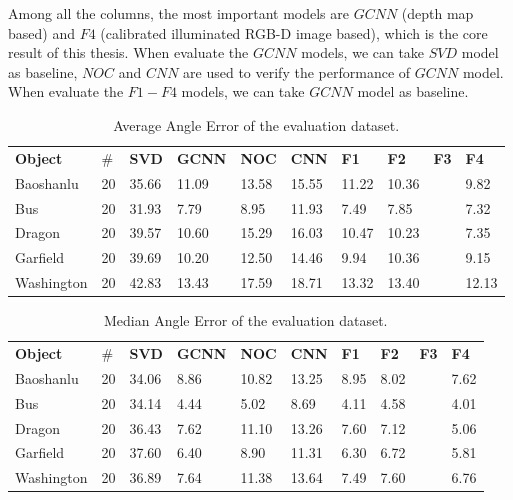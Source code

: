 \documentclass[border=15pt, multi, tikz]{article}
\newcommand{\tabhead}[1]{\textbf{#1}}
\begin{document}
Among all the columns, the most important models are $ GCNN $ (depth map based) and  $ F4 $ (calibrated illuminated RGB-D image based), which is the core result of this thesis. When evaluate the $ GCNN $ models, we can take $ SVD $ model as baseline, $ NOC $ and $ CNN $ are used to verify the performance of $ GCNN $ model. When evaluate the $ F1-F4 $ models, we can take $ GCNN $ model as baseline.


\begin{table}[H]
	\centering
	\begin{tabular}{l l | l | l l l | l l l l }
		\tabhead{Object} & $ \# $ & \tabhead{SVD} & \tabhead{GCNN} & \tabhead{NOC} & \tabhead{CNN} & \tabhead{F1}& \tabhead{F2}& \tabhead{F3}& \tabhead{F4}\\
		Baoshanlu  		& 20 & 35.66 & 11.09 & 13.58 & 15.55 & 11.22 & 10.36 & & 9.82 \\ 
		\hline
		Bus 			& 20 & 31.93 & 7.79 & 8.95 & 11.93 & 7.49 & 7.85 & & 7.32\\ 
		\hline
		Dragon 			& 20 & 39.57 & 10.60 & 15.29 & 16.03 & 10.47 & 10.23 & & 7.35 \\
		\hline
		Garfield 		& 20 & 39.69 & 10.20 & 12.50 & 14.46 & 9.94 & 10.36 & & 9.15 \\
		\hline
		Washington 		& 20 & 42.83 & 13.43 & 17.59 & 18.71 & 13.32 & 13.40 & & 12.13\\
	\end{tabular}
	\caption{Average Angle Error of the evaluation dataset.}	
	\label{tab:eval-mean}
\end{table}

\begin{table}[H]
	\centering
	\begin{tabular}{l l | l | l l l | l l l l }
		\tabhead{Object} & $ \# $ & \tabhead{SVD} & \tabhead{GCNN} & \tabhead{NOC} & \tabhead{CNN} & \tabhead{F1}& \tabhead{F2}& \tabhead{F3}& \tabhead{F4}\\
		Baoshanlu  		& 20 & 34.06 & 8.86 & 10.82 & 13.25 & 8.95 & 8.02 & & 7.62 \\ 
		\hline
		Bus 			& 20 & 34.14 & 4.44 & 5.02 & 8.69 & 4.11 & 4.58 & & 4.01 \\ 
		\hline
		Dragon 			& 20 & 36.43 & 7.62 & 11.10 & 13.26 & 7.60 & 7.12 & & 5.06 \\
		\hline
		Garfield 		& 20 & 37.60 & 6.40 & 8.90 &11.31 & 6.30 & 6.72 & & 5.81\\
		\hline
		Washington 		& 20 & 36.89 & 7.64 & 11.38 & 13.64& 7.49 & 7.60 & & 6.76\\
	\end{tabular}
	\caption{Median Angle Error of the evaluation dataset.}	
	\label{tab:eval-median}
\end{table}
\end{document}
